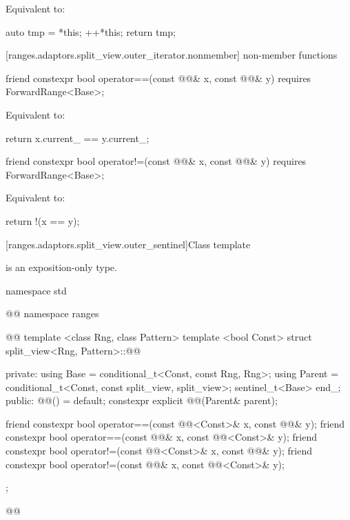 \begin{itemdescr}
\pnum
\effects Equivalent to:
\begin{codeblock}
auto tmp = *this;
++*this;
return tmp;
\end{codeblock}
\end{itemdescr}

[ranges.adaptors.split_view.outer_iterator.nonmember]{ non-member functions}

%
\begin{itemdecl}
friend constexpr bool operator==(const @@& x, const @@& y)
  requires ForwardRange<Base>;
\end{itemdecl}

\begin{itemdescr}
\pnum
\effects Equivalent to:
\begin{codeblock}
return x.current_ == y.current_;
\end{codeblock}
\end{itemdescr}

%
\begin{itemdecl}
friend constexpr bool operator!=(const @@& x, const @@& y)
  requires ForwardRange<Base>;
\end{itemdecl}

\begin{itemdescr}
\pnum
\effects Equivalent to:
\begin{codeblock}
return !(x == y);
\end{codeblock}
\end{itemdescr}

[ranges.adaptors.split_view.outer_sentinel]{Class template }

\pnum
\enternote {} is an exposition-only type.\exitnote

\begin{codeblock}
namespace std { @@ namespace ranges { @@
  template <class Rng, class Pattern>
  template <bool Const>
  struct split_view<Rng, Pattern>::@@ {
  private:
    using Base = conditional_t<Const, const Rng, Rng>;
    using Parent = conditional_t<Const, const split_view, split_view>;
    sentinel_t<Base> end_;
  public:
    @@() = default;
    constexpr explicit @@(Parent& parent);

    friend constexpr bool operator==(const @@<Const>& x, const @@& y);
    friend constexpr bool operator==(const @@& x, const @@<Const>& y);
    friend constexpr bool operator!=(const @@<Const>& x, const @@& y);
    friend constexpr bool operator!=(const @@& x, const @@<Const>& y);
  };
}}@\removed{\}\}}@
\end{codeblock}

